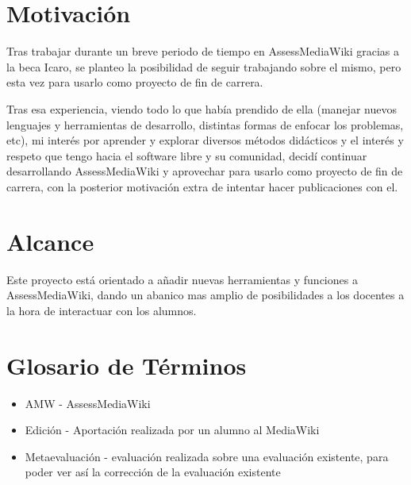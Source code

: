 

\section{Motivación}
Tras trabajar durante un breve periodo de tiempo en AssessMediaWiki gracias a la beca Icaro, se planteo la posibilidad de seguir trabajando sobre el mismo, pero esta vez para usarlo como proyecto de fin de carrera.
\newline

Tras esa experiencia, viendo todo lo que había prendido de ella (manejar nuevos lenguajes y herramientas de desarrollo, distintas formas de enfocar los problemas, etc), mi interés por aprender y explorar diversos métodos didácticos y el interés y respeto que tengo hacia el software libre y su comunidad, decidí continuar desarrollando AssessMediaWiki y aprovechar para usarlo como proyecto de fin de carrera, con la posterior motivación extra de intentar hacer publicaciones con el.

\section{Alcance} 

Este proyecto está orientado a añadir nuevas herramientas y funciones a AssessMediaWiki, dando un abanico mas amplio de posibilidades a los docentes a la hora de interactuar con los alumnos.

\section{Glosario de Términos} 

\begin{itemize}
	\item AMW - AssessMediaWiki
	\item Edición - Aportación realizada por un alumno al MediaWiki
	\item Metaevaluación - evaluación realizada sobre una evaluación existente, para poder ver así la corrección de la evaluación existente
\end{itemize}

